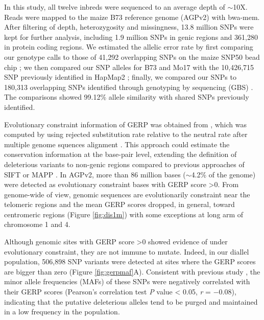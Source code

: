 \documentclass[9pt,twocolumn,twoside]{gsajnl}
\begin{document}
In this study, all twelve inbreds were sequenced to an average depth of $\sim$10X. Reads were mapped to the maize B73 reference genome (AGPv2) with bwa-mem. After filtering of depth, heterozygosity and missingness, 13.8 million SNPs were kept for further analysis, including 1.9 million SNPs in genic regions and 361,280 in protein coding regions. We estimated the allelic error rate by first comparing our genotype calls to those of 41,292 overlapping SNPs on the maize SNP50 bead chip \citep{Heerwaarden2012}; we then compared our SNP alleles for B73 and Mo17 with the 10,426,715 SNP previously identified in HapMap2 \citep{Chia2012}; finally, we compared our SNPs to 180,313 overlapping SNPs identified through genotyping by sequencing (GBS) \citep{Romay2013}. The comparisons showed 99.12\% allele similarity with shared SNPs previously identified.  

Evolutionary constraint information of GERP was obtained from \citep{rodgers2015recombination}, which was computed by using rejected substitution rate relative to the neutral rate after multiple genome squences alignment \citep{Davydov2010}. This approach could estimate the conservation information at the base-pair level, extending the definition of deleterious variants to non-genic regions compared to previous approaches of SIFT \citep{ng2003sift} or MAPP \citep{stone2005physicochemical}. In AGPv2, more than 86 million bases ($\sim$4.2\% of the genome) were detected as evolutionary constraint bases with GERP score >0. From genome-wide of view, genomic sequences are evolutionarily constraint near the telomeric regions and the mean GERP scores dropped, in general, toward centromeric regions (Figure \ref{fig:dis1m}) with some exceptions at long arm of chromosome 1 and 4.  

Although genomic sites with GERP score >0 showed evidence of under evolutionary constraint, they are not immune to mutate. Indeed, in our diallel population, 506,898 SNP variants were detected at sites where the GERP scores are bigger than zero (Figure \ref{fig:gerpmaf}A). Consistent with previous study \citep{rodgers2015recombination}, the minor allele frequencies (MAFs) of these SNPs were negatively correlated with their GERP scores (Pearson's correlation test \emph{P} value < 0.05, \emph{r} = $-$0.08), indicating that the putative deleterious alleles tend to be purged and maintained in a low frequency in the population. 
\end{document}
